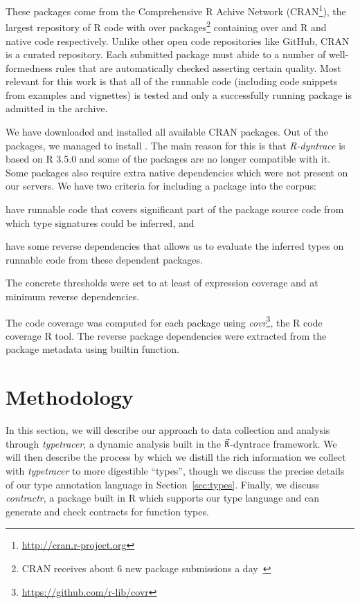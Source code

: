 \documentclass[acmsmall,review,anonymous]{acmart}\settopmatter{printfolios=true,printccs=false,printacmref=false}
\newcommand{\R}{\ensuremath{\small\vec{\mathtt R}}\xspace} %
\renewcommand{\R}{\ensuremath{\small\vec{\mathtt R}}\xspace} %
\newcommand{\contractr}{\emph{contractr}\xspace} %
\newcommand{\typetracer}{\emph{typetracer}\xspace} %
\newcommand{\rdt}{\emph{R-dyntrace}\xspace}
\newcommand{\covr}{\emph{covr}\xspace}
\begin{document}
These packages come from the Comprehensive R Achive Network
(CRAN\footnote{\url{http://cran.r-project.org}}), the largest repository of
R code with over \AllCranRnd packages\footnote{CRAN receives about 6 new
  package submissions a day~\cite{Ligges2017}} containing over \AllRCodeRnd
and \AllNativeCodeRnd R and native code respectively. Unlike other open code
repositories like GitHub, CRAN is a curated repository. Each submitted
package must abide to a number of well-formedness rules that are
automatically checked asserting certain quality. Most relevant for this work
is that all of the runnable code (including code snippets from examples and
vignettes) is tested and only a successfully running package is admitted in
the archive.

We have downloaded and installed all available CRAN packages. Out of the
\AllCranRnd packages, we managed to install \AllLoadableRnd. The main reason
for this is that \rdt is based on R 3.5.0 and some of the packages are no
longer compatible with it. Some packages also require extra native
dependencies which were not present on our servers.  We have two criteria
for including a package into the corpus:
\begin{inparaenum}[(1)]
\item have runnable code that covers significant part of the package source
  code from which type signatures could be inferred, and
\item have some reverse dependencies that allows us to evaluate the inferred
  types on runnable code from these dependent packages.
\end{inparaenum}
The concrete thresholds were set to at least \ThresholdCodeCoverage of
expression coverage and at minimum \ThresholdRevdeps reverse dependencies.

The code coverage was computed for each package using
\covr\footnote{\url{https://github.com/r-lib/covr}}, the R code coverage R
tool.  The reverse package dependencies were extracted from the package
metadata using builtin function.

%
%
%
\section{Methodology}

In this section, we will describe our approach to data collection and
analysis through \typetracer, a dynamic analysis built in the \R-dyntrace
framework.  We will then describe the process by which we distill the rich
information we collect with \typetracer to more digestible ``types'', though
we discuss the precise details of our type annotation language in
Section~\ref{sec:types}.  Finally, we discuss \contractr, a package built in
R which supports our type language and can generate and check contracts for
function types.
\end{document}
